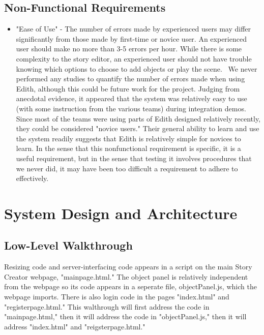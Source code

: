 \documentclass[12pt]{article}
\begin{document}
\subsection{Non-Functional Requirements}
\begin{itemize}
\item "Ease of Use" - The number of errors made by experienced users may differ significantly from those made by first-time or novice user. An experienced user should make no more than 3-5 errors per hour. While there is some complexity to the story editor, an experienced user should not have trouble knowing which options to choose to add objects or play the scene.
\ We never performed any studies to quantify the number of errors made when using Edith, although this could be future work for the project. Judging from anecdotal evidence, it appeared that the system was relatively easy to use (with some instruction from the various teams) during integration demos. Since most of the teams were using parts of Edith designed relatively recently, they could be considered "novice users." Their general ability to learn and use the system readily suggests that Edith is relatively simple for novices to learn. In the sense that this nonfunctional requirement is specific, it is a useful requirement, but in the sense that testing it involves procedures that we never did, it may have been too difficult a requirement to adhere to effectively.

\end{itemize}
\section{System Design and Architecture}

\subsection{Low-Level Walkthrough}

Resizing code and server-interfacing code appears in a script on the main Story Creator webpage, "mainpage.html." The object panel is relatively independent from the webpage so its code appears in a seperate file, objectPanel.js, which the webpage imports. There is also login code in the pages "index.html" and "registerpage.html." This walthrough will first address the code in "mainpage.html," then it will address the code in "objectPanel.js," then it will address "index.html" and "reigsterpage.html." \\
\end{document}
